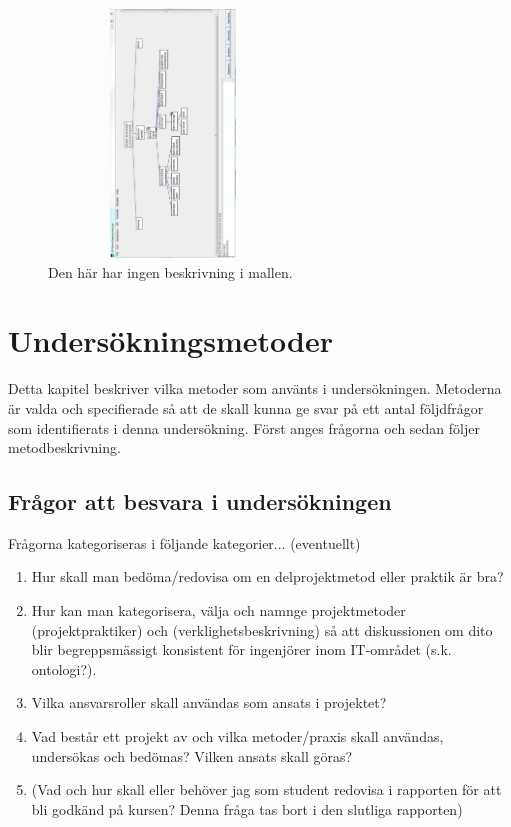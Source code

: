 \documentclass[conference]{IEEEtran}
\begin{document}
\begin{enumerate}
    \begin{figure}[htbp]
        \centerline{\includegraphics[max height=250px, max width=250px]{images/scrum.jpg}}
        \caption{Den här har ingen beskrivning i mallen.}
        \label{fig}
    \end{figure}
\end{enumerate}

\section{Undersökningsmetoder}
Detta kapitel beskriver vilka metoder som använts i undersökningen. Metoderna är
valda och specifierade så att de skall kunna ge svar på ett antal följdfrågor som
identifierats i denna undersökning. Först anges frågorna och sedan följer
metodbeskrivning.

\subsection{Frågor att besvara i undersökningen}
Frågorna kategoriseras i följande kategorier... (eventuellt)
\begin{enumerate}
    \item Hur skall man bedöma/redovisa om en delprojektmetod eller praktik är bra?
    \item Hur kan man kategorisera, välja och namnge projektmetoder (projektpraktiker)
    och (verklighetsbeskrivning) så att diskussionen om dito blir begreppsmässigt
    konsistent för ingenjörer inom IT-området (s.k. ontologi?).
    \item Vilka ansvarsroller skall användas som ansats i projektet?
    \item Vad består ett projekt av och vilka metoder/praxis skall användas, undersökas
    och bedömas? Vilken ansats skall göras?
    \item (Vad och hur skall eller behöver jag som student redovisa i rapporten för att
    bli godkänd på kursen? Denna fråga tas bort i den slutliga rapporten)
\end{enumerate}
\end{document}
